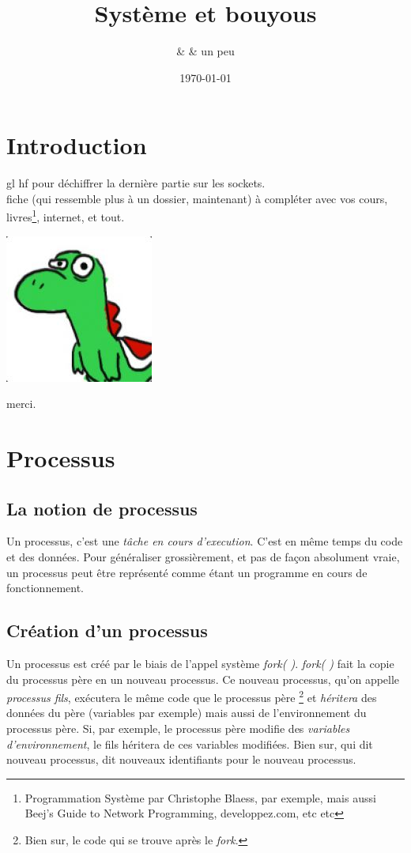 \documentclass{report}
\title{Système et bouyous}
\author{\bsc{Borey UK} \& \bsc{Steeve VINCENT} \& un peu \bsc{Elias MIA}}
\date{\today}
\begin{document}
\maketitle{}

\chapter*{Introduction}
gl hf pour déchiffrer la dernière partie sur les sockets.\\
fiche (qui ressemble plus à un dossier, maintenant) à compléter avec vos cours, livres\footnote{Programmation Système par Christophe Blaess, par exemple, mais aussi Beej's Guide to Network Programming, developpez.com, etc etc}, internet, et tout.\\
\begin{center}
\includegraphics[scale=1]{moi}
\end{center}
\begin{center}
merci.
\end{center}


\chapter{Processus}
\section{La notion de processus}
Un processus, c'est une \emph{tâche en cours d'execution}. C'est en même temps du code et des données. Pour généraliser grossièrement, et pas de façon absolument vraie, un processus peut être représenté comme étant un programme en cours de fonctionnement.

\section{Création d'un processus}
Un processus est créé par le biais de l'appel système \emph{fork( )}. \emph{fork( )} fait la copie du processus père en un nouveau processus. Ce nouveau processus, qu'on appelle \emph{processus fils}, exécutera le même code que le processus père \footnote{Bien sur, le code qui se trouve après le \emph{fork}.} et \emph{héritera} des données du père (variables par exemple) mais aussi de l'environnement du processus père. Si, par exemple, le processus père modifie des \emph{variables d'environnement}, le fils héritera de ces variables modifiées.
Bien sur, qui dit nouveau processus, dit nouveaux identifiants pour le nouveau processus.
\end{document}
